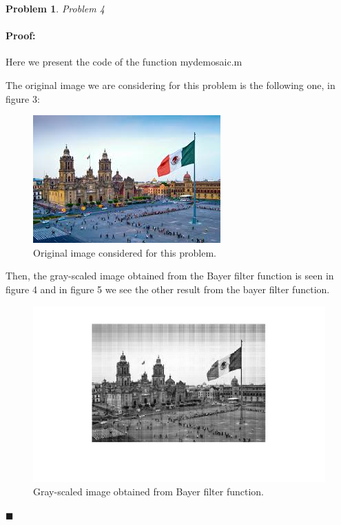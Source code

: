 \documentclass[12pt]{article}
\newenvironment{proof}{\paragraph{Proof: }}{\hfill$\blacksquare$}
\newtheorem{problem}{Problem}%
\begin{document}
\begin{problem}
Problem 4
\end{problem}

\begin{proof}
Here we present the code of the function mydemosaic.m



The original image we are considering for this problem is the following one, in figure 3:

\begin{figure}[h]
\begin{center}
\centering
\includegraphics[scale=1]{CDMX.jpg}
\caption{Original image considered for this problem.}
\label{fig:mesh1}
\end{center}
\end{figure}

Then, the gray-scaled image obtained from the Bayer filter function is seen in figure 4 and in figure 5 we see the other result from the bayer filter function. 

\begin{figure}[h]
\begin{center}
\centering
\includegraphics[scale=0.50]{CDMX_filtered_gray.jpg}
\caption{Gray-scaled image obtained from Bayer filter function.}
\label{fig:mesh1}
\end{center}
\end{figure}


\end{proof}
\end{document}

